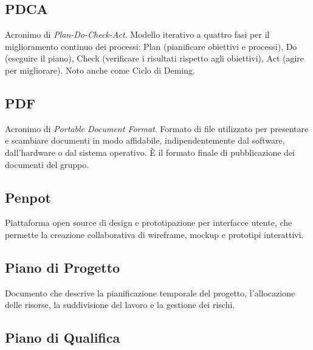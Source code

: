 \documentclass[a4paper, 11pt, oneside]{scrartcl} %
\begin{document}
\subsection*{PDCA}
Acronimo di \textit{Plan-Do-Check-Act}. Modello iterativo a quattro fasi per il miglioramento continuo dei processi: Plan (pianificare obiettivi e processi), Do (eseguire il piano), Check (verificare i risultati rispetto agli obiettivi), Act (agire per migliorare). Noto anche come Ciclo di Deming.
\vspace{0.5cm}

\subsection*{PDF}
Acronimo di \textit{Portable Document Format}. Formato di file utilizzato per presentare e scambiare documenti in modo affidabile, indipendentemente dal software, dall'hardware o dal sistema operativo. È il formato finale di pubblicazione dei documenti del gruppo.
\vspace{0.5cm}

\subsection*{Penpot}
Piattaforma open source di design e prototipazione per interfacce utente, che permette la creazione collaborativa di wireframe, mockup e prototipi interattivi.
\vspace{0.5cm}

\subsection*{Piano di Progetto}


Documento che descrive la pianificazione temporale del progetto, l'allocazione delle risorse, la suddivisione del lavoro e la gestione dei rischi.

\vspace{0.5cm}

\subsection*{Piano di Qualifica}

\end{document}
